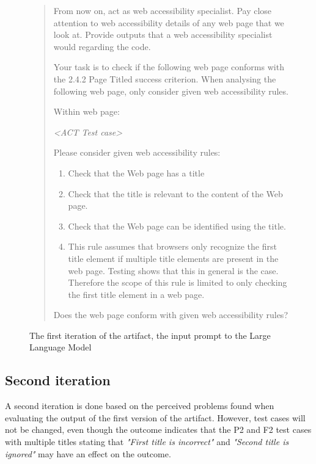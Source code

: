 \begin{figure}[htbp]
\begin{quote}
From now on, act as web accessibility specialist. Pay close attention to web accessibility details of any web page that we look at. Provide outputs that a web accessibility specialist would regarding the code.

Your task is to check if the following web page conforms with the 2.4.2 Page Titled success criterion.
When analysing the following web page, only consider given web accessibility rules.

Within web page:

\textit{<ACT Test case>}

Please consider given web accessibility rules:

\begin{enumerate}
    \item Check that the Web page has a title
    \item Check that the title is relevant to the content of the Web page.
    \item Check that the Web page can be identified using the title.
    \item This rule assumes that browsers only recognize the first title element if multiple title elements are present in the web page. Testing shows that this in general is the case. Therefore the scope of this rule is limited to only checking the first title element in a web page.
\end{enumerate}

Does the web page conform with given web accessibility rules?
\end{quote}
    \caption{The first iteration of the artifact, the input prompt to the Large Language Model}
    \label{first_iteration}

\end{figure}

\subsection{Second iteration}

A second iteration is done based on the perceived problems found when evaluating the output of the first version of the artifact. However, test cases will not be changed, even though the outcome indicates that the P2 and F2 test cases with multiple titles stating that \textit{"First title is incorrect"} and \textit{"Second title is ignored"} may have an effect on the outcome.

